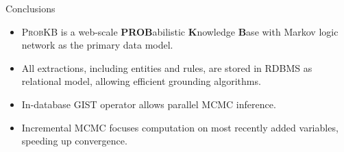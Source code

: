 \documentclass[onlymath,xcolor=pdftex,dvipsnames,table]{beamer}
\newcommand{\probkb}{\textsc{ProbKB}\xspace}
\newcommand{\felix}{\textsc{Felix}\xspace}
\newcommand{\gist}{\textsc{GIST}\xspace}
\let\oldemph\emph
\renewcommand{\emph}[1]{{\color{Blue}\oldemph{#1}}}
\newcommand{\head}[1]{{\large\color{OliveGreen}#1\\[2pt]}}
\begin{document}





\begin{frame}{Conclusions}
\begin{itemize}
  \item \probkb is a web-scale \textbf{PROB}abilistic \textbf{K}nowledge \textbf{B}ase with Markov logic network as the primary data model.
  \item All extractions, including entities and rules, are stored in RDBMS as relational model, allowing efficient grounding algorithms.
  \item In-database \gist operator allows parallel MCMC inference.
  \item Incremental MCMC focuses computation on most recently added variables, speeding up convergence.
\end{itemize}
\end{frame}
\end{document}
